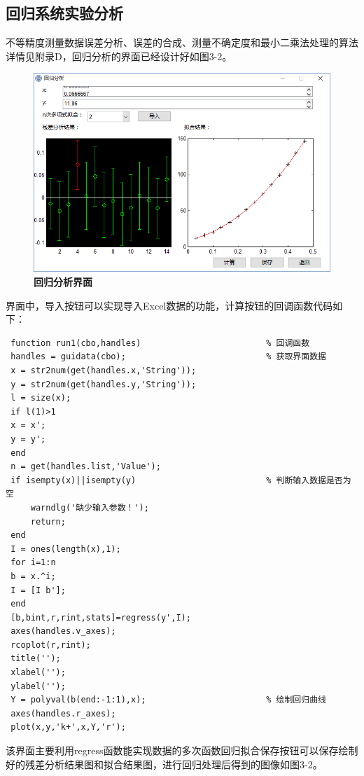 \subsection{回归系统实验分析}
不等精度测量数据误差分析、误差的合成、测量不确定度和最小二乘法处理的算法详情见附录D，回归分析的界面已经设计好如图3-2。
\begin{figure}[H]
	\centering
	\includegraphics[scale=0.5]{subsubpage5}
	\caption{\textbf{回归分析界面}}
\end{figure}

界面中，导入按钮可以实现导入Excel数据的功能，计算按钮的回调函数代码如下：
\begin{lstlisting}
 function run1(cbo,handles)							% 回调函数
 handles = guidata(cbo);							% 获取界面数据
 x = str2num(get(handles.x,'String'));
 y = str2num(get(handles.y,'String'));
 l = size(x);
 if l(1)>1
 x = x';
 y = y';
 end
 n = get(handles.list,'Value');
 if isempty(x)||isempty(y)							% 判断输入数据是否为空
	 warndlg('缺少输入参数！');
	 return;
 end
 I = ones(length(x),1);
 for i=1:n
 b = x.^i;
 I = [I b'];
 end
 [b,bint,r,rint,stats]=regress(y',I);
 axes(handles.v_axes);
 rcoplot(r,rint);
 title('');
 xlabel('');
 ylabel('');
 Y = polyval(b(end:-1:1),x);						% 绘制回归曲线
 axes(handles.r_axes);
 plot(x,y,'k+',x,Y,'r');\end{lstlisting}

该界面主要利用regress函数能实现数据的多次函数回归拟合保存按钮可以保存绘制好的残差分析结果图和拟合结果图，进行回归处理后得到的图像如图3-2。